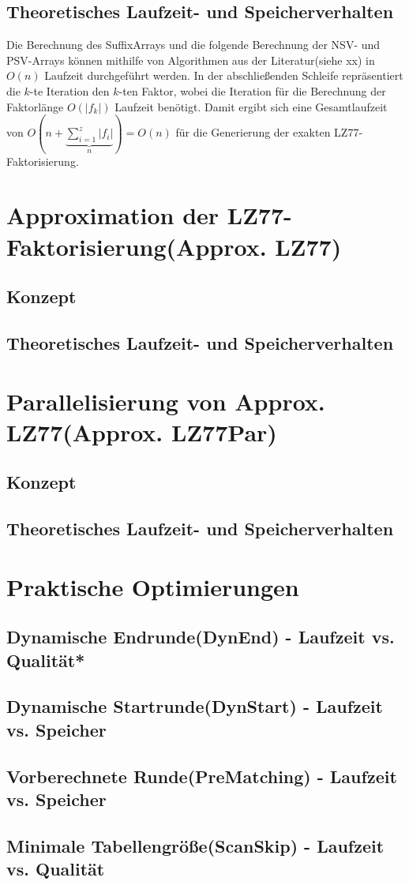 \subsection{Theoretisches Laufzeit- und Speicherverhalten}
Die Berechnung des SuffixArrays und die folgende Berechnung der NSV- und PSV-Arrays können mithilfe von Algorithmen aus der Literatur(siehe xx) in $O(n)$ Laufzeit 
durchgeführt werden. In der abschließenden Schleife repräsentiert die $k$-te Iteration den $k$-ten Faktor, wobei die Iteration für die Berechnung der Faktorlänge
$O(|f_k|)$ Laufzeit benötigt. Damit ergibt sich eine Gesamtlaufzeit von $O(n +\underbrace{\sum_{i=1}^{z} |f_i|}_{n}) = O(n)$ für die Generierung der exakten LZ77-Faktorisierung.
\section{Approximation der LZ77-Faktorisierung(Approx. LZ77)}
\subsection{Konzept}
\subsection{Theoretisches Laufzeit- und Speicherverhalten}

\section{Parallelisierung von Approx. LZ77(Approx. LZ77Par)}
\subsection{Konzept}
\subsection{Theoretisches Laufzeit- und Speicherverhalten}

\section{Praktische Optimierungen}
\subsection{Dynamische Endrunde(DynEnd) - Laufzeit vs. Qualität*}
\subsection{Dynamische Startrunde(DynStart) - Laufzeit vs. Speicher}
\subsection{Vorberechnete Runde(PreMatching) - Laufzeit vs. Speicher}
\subsection{Minimale Tabellengröße(ScanSkip) - Laufzeit vs. Qualität}